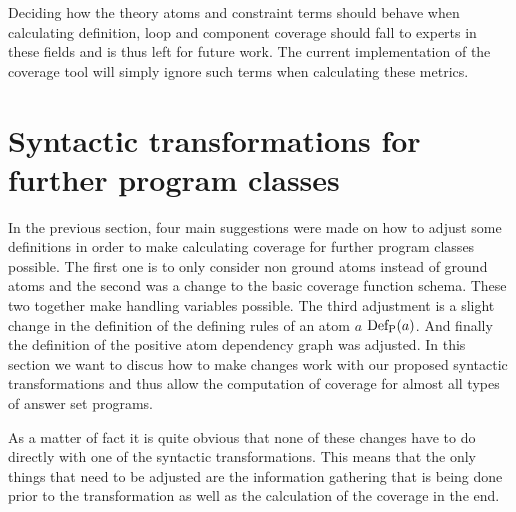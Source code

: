 Deciding how the theory atoms and constraint terms should behave when calculating definition, loop and component coverage should fall to experts in these fields and is thus left for future work. The current implementation of the coverage tool will simply ignore such terms when calculating these metrics.

\begin{comment}
- explain how variable influence everything + how i chose to handle them (different approaches might be possible!)
 -> maximal coverage can not be computed as this requires listing of all possible inputs! (might be infinitely many with variables) -> basic coverage function schema has to be changed! (non infinite domain for variables could fix this?)

- show table with all the constructs that exist in asp (maybe short explanation of each or just point to the guide)

- go over each construct and explain how they should/might work with each coverage metric and how variables influence this or not
\end{comment}

\section{Syntactic transformations for further program classes}
\label{sec:Coverage for further program classes/Syntactic transformations for further program classes}
In the previous section, four main suggestions were made on how to adjust some definitions in order to make calculating coverage for further program classes possible. The first one is to only consider non ground atoms instead of ground atoms and the second was a change to the basic coverage function schema. These two together make handling variables possible. The third adjustment is a slight change in the definition of the defining rules of an atom $a$ \(\operatorname{Def_P}(a)\). And finally the definition of the positive atom dependency graph was adjusted. In this section we want to discus how to make changes work with our proposed syntactic transformations and thus allow the computation of coverage for almost all types of answer set programs.

As a matter of fact it is quite obvious that none of these changes have to do directly with one of the syntactic transformations. This means that the only things that need to be adjusted are the information gathering that is being done prior to the transformation as well as the calculation of the coverage in the end.

